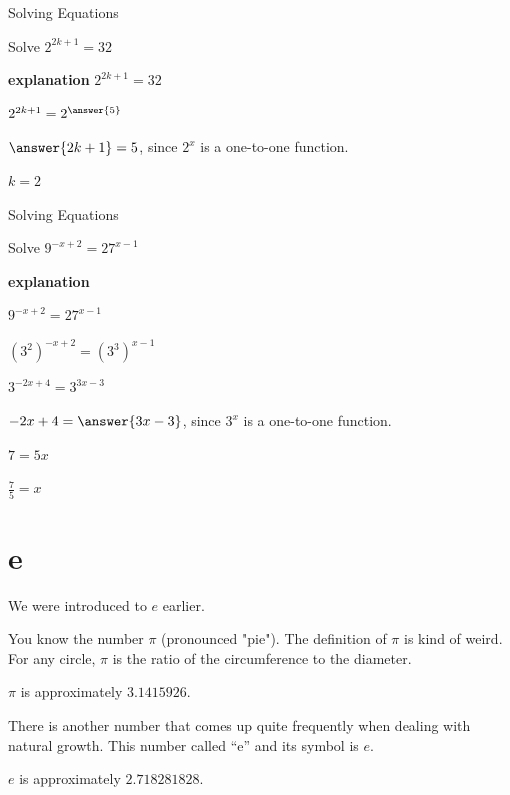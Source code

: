 \documentclass{ximera}
\begin{document}
\begin{example} Solving Equations


Solve $2^{2k+1} = 32$


\textbf{\textcolor{red!75!green}{explanation}} 
$2^{2k+1} = 32$

$2^{2k+1} = 2^{\answer{5}}$

$\answer{2k + 1} = 5$, since $2^x$ is a one-to-one function.

$k = 2$

\end{example}






\begin{example} Solving Equations


Solve $9^{-x + 2} = 27^{x-1}$


\textbf{\textcolor{red!75!green}{explanation}} 

$9^{-x + 2} = 27^{x-1}$

$(3^2)^{-x + 2} = (3^3)^{x-1}$

$3^{-2x+4} = 3^{3x-3}$    

$-2x + 4 = \answer{3x - 3}$, since $3^x$ is a one-to-one function.

$7 = 5x$


$\frac{7}{5} = x$


\end{example}














\section*{e}


We were introduced to $e$ earlier. 

You know the number $\pi$ (pronounced "pie").  The definition of $\pi$ is kind of weird.  For any circle, $\pi$ is the ratio of the circumference to the diameter.

$\pi$ is approximately $3.1415926$.





There is another number that comes up quite frequently when dealing with natural growth.  This number called ``e'' and its symbol is $e$.

$e$ is approximately $2.718281828$.
\end{document}
